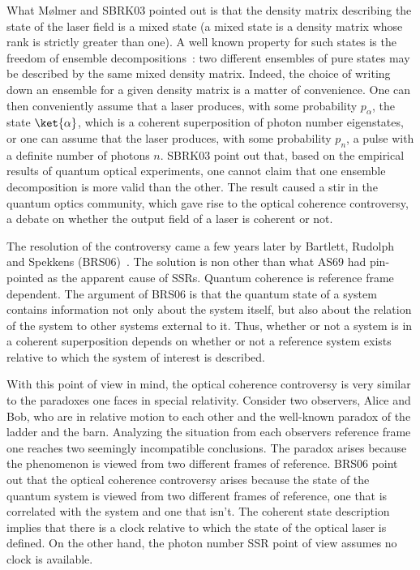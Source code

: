 What M{\o}lmer and SBRK03 pointed out is that the density matrix describing the state of the laser field is a mixed state (a mixed state is a density matrix whose rank is strictly greater than one). A well known property for such states is the freedom of ensemble decompositions~\cite{NC00}: two different ensembles of pure states may be described by the same mixed density matrix.  Indeed, the choice of writing down an ensemble for a given density matrix is a matter of convenience. One can then conveniently assume that a laser produces, with some probability $p_\alpha$, the state $\ket{\alpha}$, which is a coherent superposition of photon number eigenstates, or one can assume that the laser produces, with some probability $p_n$, a pulse with a definite number of photons $n$. SBRK03 point out that, based on the empirical results of quantum optical experiments, one cannot claim that one ensemble decomposition is more valid than the other. The result caused a stir in the quantum optics community, which gave rise to the optical coherence controversy, a debate on whether the output field of a laser is coherent or not. 

The resolution of the controversy came a few years later by Bartlett, Rudolph and Spekkens (BRS06)~\cite{BRS06}.  The solution is non other than what AS69 had pin-pointed as the apparent cause of SSRs. Quantum coherence is reference frame dependent.  The argument of BRS06 is that the quantum state of a system contains information not only about the system itself, but also about the relation of the system to other systems external to it.  Thus, whether or not a system is in a coherent superposition depends on whether or not a reference system exists relative to which the system of interest is described.

With this point of view in mind, the optical coherence controversy is very similar to the paradoxes one faces in special relativity.  Consider two observers, Alice and Bob, who are in relative motion to each other and the well-known paradox of the ladder and the barn. Analyzing the situation from each observers reference frame one reaches two seemingly incompatible conclusions.  The paradox arises because the phenomenon is viewed from two different frames of reference.  BRS06 point out that the optical coherence controversy arises because the state of the quantum system is viewed from two different frames of reference, one that is correlated with the system and one that isn't.  The coherent state description implies that there is a clock relative to which the state of the optical laser is defined.  On the other hand, the photon number SSR point of view assumes no clock is available. 


